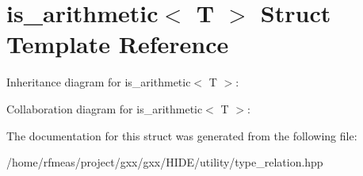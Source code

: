\hypertarget{structis__arithmetic}{}\section{is\+\_\+arithmetic$<$ T $>$ Struct Template Reference}
\label{structis__arithmetic}


Inheritance diagram for is\+\_\+arithmetic$<$ T $>$\+:


Collaboration diagram for is\+\_\+arithmetic$<$ T $>$\+:


The documentation for this struct was generated from the following file\+:\begin{DoxyCompactItemize}
\item 
/home/rfmeas/project/gxx/gxx/\+H\+I\+D\+E/utility/type\+\_\+relation.\+hpp\end{DoxyCompactItemize}
